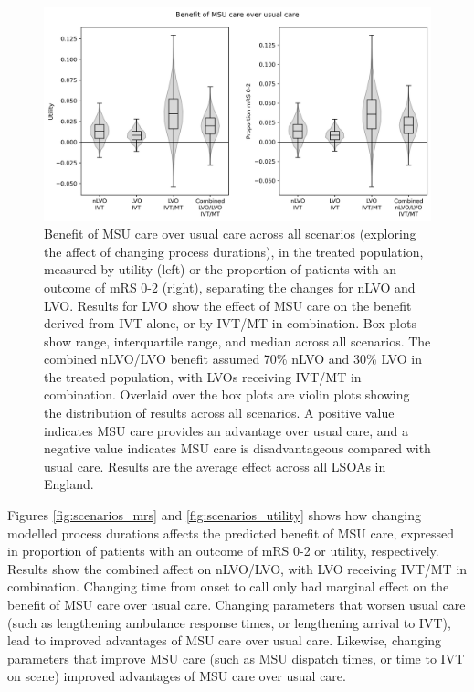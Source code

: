 \begin{figure}[h!]
    \centering
    \includegraphics[width=0.75\linewidth]{images/scenario_results_summary.png}
    \caption{Benefit of MSU care over usual care across all scenarios (exploring the affect of changing process durations), in the treated population, measured by utility (left) or the proportion of patients with an outcome of mRS 0-2 (right), separating the changes for nLVO and LVO. Results for LVO show the effect of MSU care on the benefit derived from IVT alone, or by IVT/MT in combination. Box plots show range, interquartile range, and median across all scenarios. The combined nLVO/LVO benefit assumed 70\% nLVO and 30\% LVO in the treated population, with LVOs receiving IVT/MT in combination. Overlaid over the box plots are violin plots showing the distribution of results across all scenarios. A positive value indicates MSU care provides an advantage over usual care, and a negative value indicates MSU care is disadvantageous compared with usual care. Results are the average effect across all LSOAs in England.}
    \label{fig:scenarios_overview}
\end{figure}

Figures \ref{fig:scenarios_mrs}  and \ref{fig:scenarios_utility} shows how changing modelled process durations affects the predicted benefit of MSU care, expressed in proportion of patients with an outcome of mRS 0-2 or utility, respectively. Results show the combined affect on nLVO/LVO, with LVO receiving IVT/MT in combination. Changing time from onset to call only had marginal effect on the benefit of MSU care over usual care. Changing parameters that worsen usual care (such as lengthening ambulance response times, or lengthening arrival to IVT), lead to improved advantages of MSU care over usual care. Likewise, changing parameters that improve MSU care (such as MSU dispatch times, or time to IVT on scene) improved advantages of MSU care over usual care.

